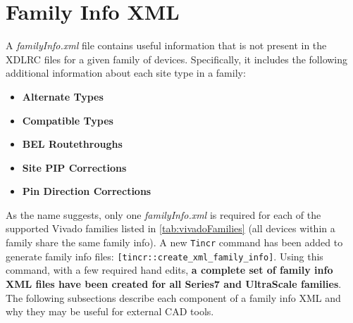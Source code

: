 \newpage
\section{Family Info XML} \label{sec:familyInfo}
\graphicspath{{./techReportFigures/appendixB/}}

A \textit{familyInfo.xml} file contains useful information that is
not present in the XDLRC files for a given family of devices. Specifically, it
includes the following additional information about each site type in a family:

\begin{multicols}{2} 
	\begin {itemize}
      \item \textbf{Alternate Types}
      \item \textbf{Compatible Types}
      \item \textbf{BEL Routethroughs}
      \item \textbf{Site PIP Corrections}
      \item \textbf{Pin Direction Corrections}
	\end{itemize}
\end{multicols}

\noindent 
As the name suggests,  only one \textit{familyInfo.xml} is required for each of
the supported Vivado families listed in \autoref{tab:vivadoFamilies} (all
devices within a family share the same family info).  A new \texttt{Tincr}
command has been added to generate family info files:
\texttt{[tincr::create\_xml\_family\_info]}.  Using this command, with a few
required hand edits, \textbf{a complete set of family info XML files have been
created for all Series7 and UltraScale families}.  The following subsections
describe each component of a family info XML and why they may be useful for
external CAD tools.

